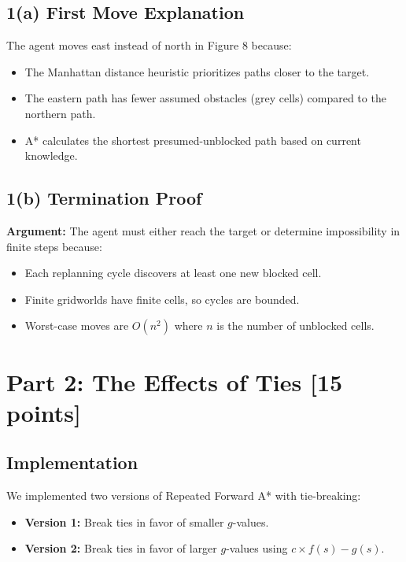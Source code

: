 \documentclass[12pt]{article}
\begin{document}
\subsection*{1(a) First Move Explanation}
The agent moves east instead of north in Figure 8 because: 
\begin{itemize}
    \item The Manhattan distance heuristic prioritizes paths closer to the target.
    \item The eastern path has fewer assumed obstacles (grey cells) compared to the northern path.
    \item A* calculates the shortest presumed-unblocked path based on current knowledge.
\end{itemize}

\subsection*{1(b) Termination Proof}
\textbf{Argument:} The agent must either reach the target or determine impossibility in finite steps because:
\begin{itemize}
    \item Each replanning cycle discovers at least one new blocked cell.
    \item Finite gridworlds have finite cells, so cycles are bounded.
    \item Worst-case moves are \(O(n^2)\) where \(n\) is the number of unblocked cells.
\end{itemize}

\section*{Part 2: The Effects of Ties [15 points]}
\label{sec:part2}

\subsection*{Implementation}
We implemented two versions of Repeated Forward A* with tie-breaking:
\begin{itemize}
    \item \textbf{Version 1:} Break ties in favor of smaller \(g\)-values.
    \item \textbf{Version 2:} Break ties in favor of larger \(g\)-values using \(c \times f(s) - g(s)\).
\end{itemize}
\end{document}
